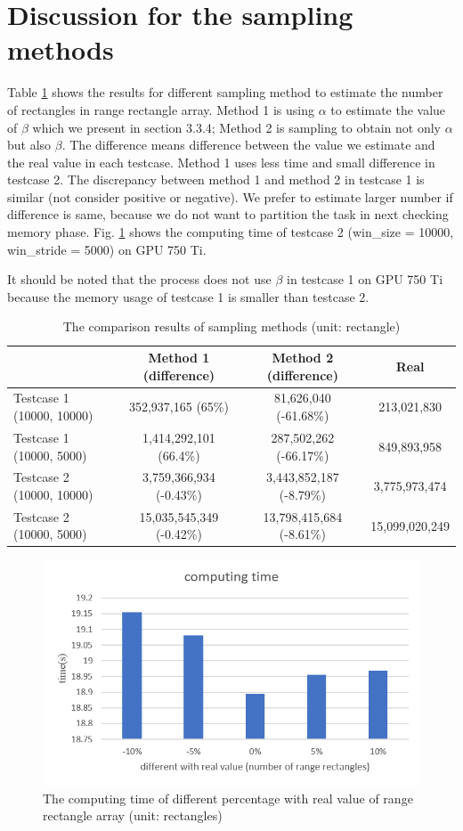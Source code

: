 \section{Discussion for the sampling methods}
Table \ref{table:5_16} shows the results for different sampling method to estimate the number of rectangles in range rectangle array. Method 1 is using $\alpha$ to estimate the value of $\beta$ which we present in section 3.3.4; Method 2 is sampling to obtain not only $\alpha$ but also $\beta$. The difference means difference between the value we estimate and the real value in each testcase. Method 1 uses less time and small difference in testcase 2. The discrepancy between method 1 and method 2 in testcase 1 is similar (not consider positive or negative). We prefer to estimate larger number if difference is same, because we do not want to partition the task in next checking memory phase. Fig. \ref{fig:fig_5_15} shows the computing time of testcase 2 (win\_size = 10000, win\_stride = 5000) on GPU 750 Ti.

It should be noted that the process does not use $\beta$ in testcase 1 on GPU 750 Ti because the memory usage of testcase 1 is smaller than testcase 2.

\begin{table}[h!]
\centering
\begin{tabular}{| l | c | c | c |} 
 \hline
  & Method 1 (difference) & Method 2 (difference) & Real \\ [0.5ex] \hline
  Testcase 1 (10000, 10000) & 352,937,165 (65\%) & 81,626,040 (-61.68\%) & 213,021,830\\ \hline
  Testcase 1 (10000, 5000) & 1,414,292,101 (66.4\%) & 287,502,262 (-66.17\%) & 849,893,958\\ \hline
  Testcase 2 (10000, 10000) & 3,759,366,934 (-0.43\%) & 3,443,852,187 (-8.79\%) & 3,775,973,474\\ \hline
  Testcase 2 (10000, 5000) & 15,035,545,349 (-0.42\%) & 13,798,415,684 (-8.61\%) & 15,099,020,249\\ \hline
\end{tabular}
\caption{The comparison results of sampling methods (unit: rectangle)}
\label{table:5_16}
\end{table}

\begin{figure}[!h]
    \centering
    \includegraphics[scale=0.7]{image/fig_5_15}
    \caption{The computing time of different percentage with real value of range rectangle array (unit: rectangles)}
    \label{fig:fig_5_15}
\end{figure}